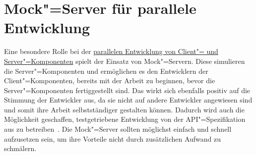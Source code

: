 \section{Mock"=Server für parallele Entwicklung}
\label{sec:mock-server}
Eine besondere Rolle bei der \hyperref[sec:parallel-dev]{parallelen Entwicklung von Client"= und Server"=Komponenten} spielt der Einsatz von Mock"=Servern.
Diese simulieren die Server"=Komponenten und ermöglichen es den Entwicklern der Client"=Komponenten, bereits mit der Arbeit zu beginnen, bevor die Server"=Komponenten fertiggestellt sind.
Das wirkt sich ebenfalls positiv auf die Stimmung der Entwickler aus, da sie nicht auf andere Entwickler angewiesen sind und somit ihre Arbeit selbstständiger gestalten können.
Dadurch wird auch die Möglichkeit geschaffen, testgetriebene Entwicklung von der \ac{API}"=Spezifikation aus zu betreiben~\cite[351,353]{de23}.
Die Mock"=Server sollten möglichst einfach und schnell aufzusetzen sein, um ihre Vorteile nicht durch zusätzlichen Aufwand zu schmälern.